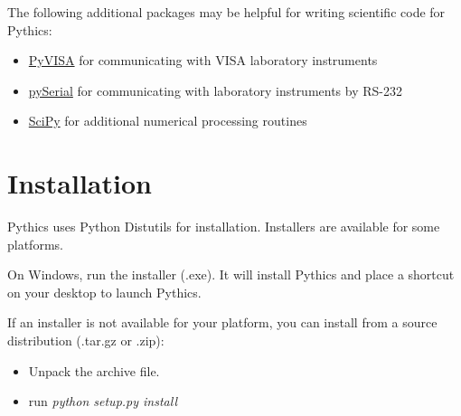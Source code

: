 \documentclass[letterpaper,10pt,english]{sphinxmanual}
\begin{document}
The following additional packages may be helpful for writing scientific code
for Pythics:
\begin{itemize}
\item {} 
\href{http://pyvisa.sourceforge.net/}{PyVISA} for communicating with VISA laboratory instruments

\item {} 
\href{http://pyserial.sourceforge.net/}{pySerial} for communicating with laboratory instruments by RS-232

\item {} 
\href{http://www.scipy.org/}{SciPy} for additional numerical processing routines

\end{itemize}


\section{Installation}
\label{getting_started:installation}
Pythics uses Python Distutils for installation. Installers are available for
some platforms.

On Windows, run the installer (.exe). It will install Pythics and place a
shortcut on your desktop to launch Pythics.

If an installer is not available for your platform, you can install from a
source distribution (.tar.gz or .zip):
\begin{itemize}
\item {} 
Unpack the archive file.

\item {} 
run \emph{python setup.py install}

\end{itemize}
\end{document}
